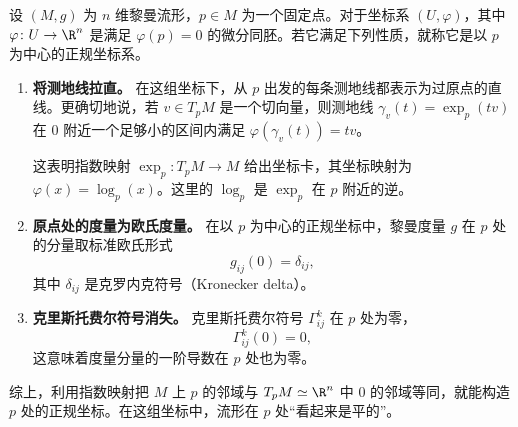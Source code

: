 设 $(M,g)$ 为 $n$ 维黎曼流形，$p\in M$ 为一个固定点。对于坐标系 $(U,\varphi)$，其中 $\varphi\colon U\to\R^n$ 是满足 $\varphi(p)=0$ 的微分同胚。若它满足下列性质，就称它是以 $p$ 为中心的正规坐标系。
\begin{enumerate}
\item \textbf{将测地线拉直。}
在这组坐标下，从 $p$ 出发的每条测地线都表示为过原点的直线。更确切地说，若 $v\in T_pM$ 是一个切向量，则测地线 $\gamma_v(t)=\exp_p(tv)$ 在 $0$ 附近一个足够小的区间内满足 $\varphi(\gamma_v(t))=tv$。

这表明指数映射 $\exp_p\colon T_pM\to M$ 给出坐标卡，其坐标映射为 $\varphi(x)=\log_p(x)$。这里的 $\log_p$ 是 $\exp_p$ 在 $p$ 附近的逆。
\item \textbf{原点处的度量为欧氏度量。}
在以 $p$ 为中心的正规坐标中，黎曼度量 $g$ 在 $p$ 处的分量取标准欧氏形式
\[
  g_{ij}(0)=\delta_{ij},
\]
其中 $\delta_{ij}$ 是克罗内克符号（Kronecker delta）。
\item \textbf{克里斯托费尔符号消失。}
克里斯托费尔符号 $\Gamma^k_{ij}$ 在 $p$ 处为零，
\[
  \Gamma^k_{ij}(0)=0,
\]
这意味着度量分量的一阶导数在 $p$ 处也为零。
\end{enumerate}
综上，利用指数映射把 $M$ 上 $p$ 的邻域与 $T_pM\simeq\R^n$ 中 0 的邻域等同，就能构造 $p$ 处的正规坐标。在这组坐标中，流形在 $p$ 处“看起来是平的”。

